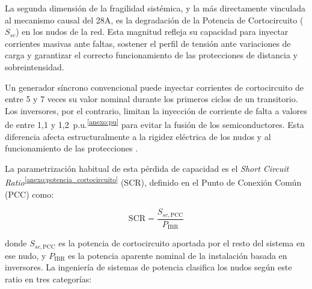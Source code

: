 La segunda dimensión de la fragilidad sistémica, y la más directamente
vinculada al mecanismo causal del 28A, es la degradación de la Potencia
de Cortocircuito ($S_{sc}$) en los nudos de la red. Esta magnitud
refleja su capacidad para inyectar corrientes masivas ante faltas,
sostener el perfil de tensión ante variaciones de carga y garantizar el
correcto funcionamiento de las protecciones de distancia y
sobreintensidad.

Un generador síncrono convencional puede inyectar corrientes de
cortocircuito de entre 5 y 7 veces su valor nominal durante los
primeros ciclos de un transitorio. Los inversores, por el contrario,
limitan la inyección de corriente de falta a valores de entre 1{,}1
y 1{,}2~p.u.\textsuperscript{\ref{anexo:pu}} para evitar la fusión de
los semiconductores. Esta diferencia afecta estructuralmente a la
rigidez eléctrica de los nudos y al funcionamiento de las protecciones
\cite{nrel2025,icai2025}.

La parametrización habitual de esta pérdida de capacidad es el
\textit{Short Circuit Ratio}\textsuperscript{\ref{anexo:potencia_cortocircuito}}
(SCR), definido en el Punto de Conexión Común (PCC) como:

\begin{equation}
    \mathrm{SCR} = \frac{S_{sc,\mathrm{PCC}}}{P_{\mathrm{IBR}}}
    \label{eq:scr}
\end{equation}

donde $S_{sc,\mathrm{PCC}}$ es la potencia de cortocircuito aportada
por el resto del sistema en ese nudo, y $P_{\mathrm{IBR}}$ es la
potencia aparente nominal de la instalación basada en inversores. La
ingeniería de sistemas de potencia clasifica los nudos según este ratio
en tres categorías:

